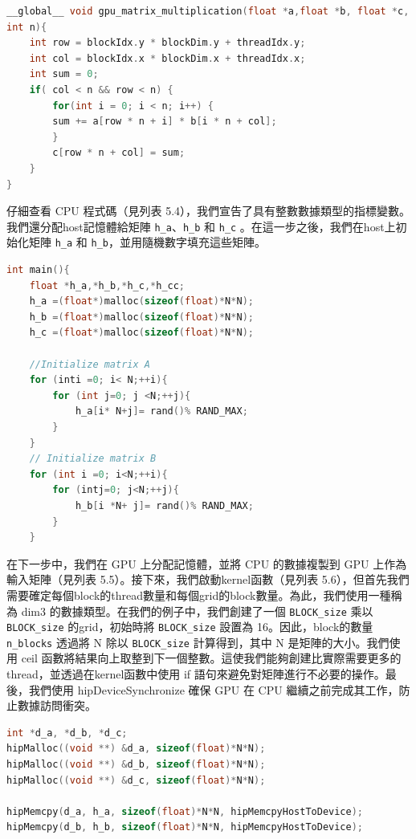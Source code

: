 \lstset{style=mystyle}
\begin{lstlisting}[language=c++,caption={GPU程式碼}]
__global__ void gpu_matrix_multiplication(float *a,float *b, float *c,
int n){
    int row = blockIdx.y * blockDim.y + threadIdx.y;
    int col = blockIdx.x * blockDim.x + threadIdx.x;
    int sum = 0;
    if( col < n && row < n) {
        for(int i = 0; i < n; i++) {
        sum += a[row * n + i] * b[i * n + col];
        }
        c[row * n + col] = sum;
    }
}
\end{lstlisting}

\vspace{1em}
仔細查看 CPU 程式碼（見列表 5.4），我們宣告了具有整數數據類型的指標變數。我們還分配host記憶體給矩陣 \texttt{h\_a}、\texttt{h\_b} 和 \texttt{h\_c} 。在這一步之後，我們在host上初始化矩陣 \texttt{h\_a} 和 \texttt{h\_b}，並用隨機數字填充這些矩陣。

\lstset{style=mystyle}
\begin{lstlisting}[language=c++,caption={CPU 記憶體分配矩陣初始化}]
int main(){
    float *h_a,*h_b,*h_c,*h_cc;
    h_a =(float*)malloc(sizeof(float)*N*N);
    h_b =(float*)malloc(sizeof(float)*N*N);
    h_c =(float*)malloc(sizeof(float)*N*N);

    //Initialize matrix A
    for (inti =0; i< N;++i){
        for (int j=0; j <N;++j){
            h_a[i* N+j]= rand()% RAND_MAX;
        }
    }
    // Initialize matrix B
    for (int i =0; i<N;++i){
        for (intj=0; j<N;++j){
            h_b[i *N+ j]= rand()% RAND_MAX;
        }
    }
\end{lstlisting}

\vspace{1em}
在下一步中，我們在 GPU 上分配記憶體，並將 CPU 的數據複製到 GPU 上作為輸入矩陣（見列表 5.5）。接下來，我們啟動kernel函數（見列表 5.6），但首先我們需要確定每個block的thread數量和每個grid的block數量。為此，我們使用一種稱為 dim3 的數據類型。在我們的例子中，我們創建了一個 \texttt{BLOCK\_size} 乘以 \texttt{BLOCK\_size} 的grid，初始時將 \texttt{BLOCK\_size} 設置為 16。因此，block的數量 \texttt{n\_blocks} 透過將 N 除以 \texttt{BLOCK\_size} 計算得到，其中 N 是矩陣的大小。我們使用 ceil 函數將結果向上取整到下一個整數。這使我們能夠創建比實際需要更多的thread，並透過在kernel函數中使用 if 語句來避免對矩陣進行不必要的操作。最後，我們使用 hipDeviceSynchronize 確保 GPU 在 CPU 繼續之前完成其工作，防止數據訪問衝突。

\lstset{style=mystyle}
\begin{lstlisting}[language=c++,caption={GPU 記憶體分配與資料傳輸（host到device）}]
int *d_a, *d_b, *d_c;
hipMalloc((void **) &d_a, sizeof(float)*N*N);
hipMalloc((void **) &d_b, sizeof(float)*N*N);
hipMalloc((void **) &d_c, sizeof(float)*N*N);

hipMemcpy(d_a, h_a, sizeof(float)*N*N, hipMemcpyHostToDevice);
hipMemcpy(d_b, h_b, sizeof(float)*N*N, hipMemcpyHostToDevice);
\end{lstlisting}

